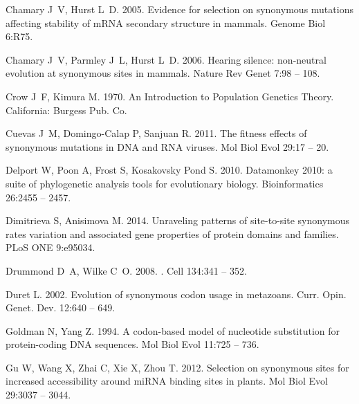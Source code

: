 \documentclass[11pt]{article}
\begin{document}
\begin{thebibliography}{79}
Chamary J~V, Hurst L~D. 2005.
\newblock Evidence for selection on synonymous mutations affecting stability of
  {mRNA} secondary structure in mammals.
\newblock Genome Biol 6:R75.

Chamary J~V, Parmley J~L, Hurst L~D. 2006.
\newblock Hearing silence: non-neutral evolution at synonymous sites in
  mammals.
\newblock Nature Rev Genet 7:98 -- 108.

Crow J~F, Kimura M. 1970.
\newblock An Introduction to Population Genetics Theory.
\newblock California: Burgess Pub. Co.

Cuevas J~M, Domingo-Calap P, Sanjuan R. 2011.
\newblock The fitness effects of synonymous mutations in {DNA} and {RNA}
  viruses.
\newblock Mol Biol Evol 29:17 -- 20.

Delport W, Poon A, Frost S, {Kosakovsky Pond} S. 2010.
\newblock Datamonkey 2010: a suite of phylogenetic analysis tools for
  evolutionary biology.
\newblock Bioinformatics 26:2455 -- 2457.

Dimitrieva S, Anisimova M. 2014.
\newblock Unraveling patterns of site-to-site synonymous rates variation and
  associated gene properties of protein domains and families.
\newblock PLoS ONE 9:e95034.

Drummond D~A, Wilke C~O. 2008.
.
\newblock Cell 134:341 -- 352.

Duret L. 2002.
\newblock Evolution of synonymous codon usage in metazoans.
\newblock Curr. Opin. Genet. Dev. 12:640 -- 649.

Goldman N, Yang Z. 1994.
\newblock A codon-based model of nucleotide substitution for protein-coding
  {DNA} sequences.
\newblock Mol Biol Evol 11:725 -- 736.

Gu W, Wang X, Zhai C, Xie X, Zhou T. 2012.
\newblock Selection on synonymous sites for increased accessibility around
  {miRNA} binding sites in plants.
\newblock Mol Biol Evol 29:3037 -- 3044.


\end{thebibliography}
\end{document}
